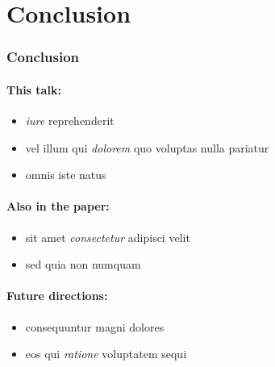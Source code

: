 \documentclass{beamer}
\begin{document}
\begin{frame}[label=outline]
    
\end{frame}


\section{Conclusion}
\begin{frame}
  \frametitle{Conclusion}
  \paragraph{This talk:}
  \begin{itemize}
  \item \emph{iure} reprehenderit
  \item vel illum qui \emph{dolorem} quo voluptas nulla pariatur 
  \item omnis iste natus
  \end{itemize}
  \paragraph{Also in the paper:}
  \begin{itemize}
  \item sit amet \emph{consectetur} adipisci velit
  \item sed quia non numquam
  \end{itemize}
  \paragraph{Future directions:}
  \begin{itemize}
  \item consequuntur magni dolores
  \item eos qui \emph{ratione} voluptatem sequi
  \end{itemize}
  \vspace{15pt}
\end{frame}

\end{document}
